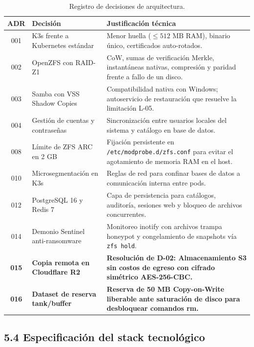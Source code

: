 \documentclass[10pt,a4paper]{article}
\begin{document}
\begin{table}[htbp]
\centering
\small
\caption{Registro de decisiones de arquitectura.}
\label{tab:adrs}
\begin{tabular}{|c|p{4cm}|p{9.8cm}|}
\hline
\textbf{\textsf{ADR}} & \textbf{\textsf{Decisión}} & \textbf{\textsf{Justificación técnica}} \\
\hline
001 & K3s frente a Kubernetes estándar & Menor huella ($\le 512\text{ MB RAM}$), binario único, certificados auto-rotados. \\
\hline
002 & OpenZFS con RAID-Z1 & CoW, sumas de verificación Merkle, instantáneas nativas, compresión y paridad frente a fallo de un disco. \\
\hline
003 & Samba con VSS Shadow Copies & Compatibilidad nativa con Windows; autoservicio de restauración que resuelve la limitación L-05. \\
\hline
004 & Gestión de cuentas y contraseñas & Sincronización entre usuarios locales del sistema y catálogo en base de datos. \\
\hline
008 & Límite de ZFS ARC en 2 GB & Fijación persistente en \texttt{/etc/modprobe.d/zfs.conf} para evitar el agotamiento de memoria RAM en el host. \\
\hline
010 & Microsegmentación en K3s & Reglas de red para confinar bases de datos a comunicación interna entre pods. \\
\hline
012 & PostgreSQL 16 y Redis 7 & Capa de persistencia para catálogos, auditoría, sesiones web y bloqueo de archivos concurrentes. \\
\hline
014 & Demonio Sentinel anti-ransomware & Monitoreo inotify con archivos trampa honeypot y congelamiento de snapshots vía \texttt{zfs hold}. \\
\hline
\textbf{015} & \textbf{Copia remota en Cloudflare R2} & \textbf{Resolución de D-02: Almacenamiento S3 sin costos de egreso con cifrado simétrico AES-256-CBC.} \\
\hline
\textbf{016} & \textbf{Dataset de reserva tank/buffer} & \textbf{Reserva de 50 MB Copy-on-Write liberable ante saturación de disco para desbloquear comandos rm.} \\
\hline
\end{tabular}
\end{table}

\newpage
\subsection{5.4 Especificación del stack tecnológico}
\end{document}
